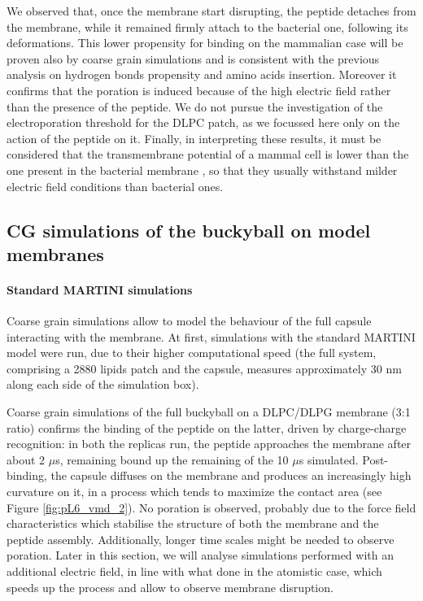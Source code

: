 We observed that, once the membrane start disrupting, the peptide detaches from the membrane, while it remained firmly attach to the bacterial one, following its deformations. This lower propensity for binding on the mammalian case will be proven also by coarse grain simulations and is consistent with the previous analysis on hydrogen bonds propensity and amino acids insertion. Moreover it confirms that the poration is induced because of the high electric field rather than the presence of the peptide. We do not pursue the investigation of the electroporation threshold for the DLPC patch, as we focussed here only on the action of the peptide on it.
%
Finally, in interpreting these results, it must be considered that the transmembrane potential of a mammal cell is lower than the one present in the bacterial membrane \citep{Yeaman2003,Wilson2011}, so that they usually withstand milder electric field conditions than bacterial ones.


\subsection{CG simulations of the buckyball on model membranes} \label{sec:results_lip_cg}

\paragraph{Standard MARTINI simulations} Coarse grain simulations allow to model the behaviour of the full capsule interacting with the membrane.
%
At first, simulations with the standard MARTINI model were run, due to their higher computational speed (the full system, comprising a 2880 lipids patch and the capsule, measures approximately 30 nm along each side of the simulation box).

Coarse grain simulations of the full buckyball on a DLPC/DLPG membrane (3:1 ratio) confirms the binding of the peptide on the latter, driven by charge-charge recognition: in both the replicas run, the peptide approaches the membrane after about 2 $\mu$s, remaining bound up the remaining of the 10 $\mu$s simulated.
%
Post-binding, the capsule diffuses on the membrane and produces an increasingly high curvature on it, in a process which tends to maximize the contact area (see Figure \ref{fig:pL6_vmd_2}). No poration is observed, probably due to the force field characteristics which stabilise the structure of both the membrane and the peptide assembly. Additionally, longer time scales might be needed to observe poration. Later in this section, we will analyse simulations performed with an additional electric field, in line with what done in the atomistic case, which speeds up the process and allow to observe membrane disruption.

